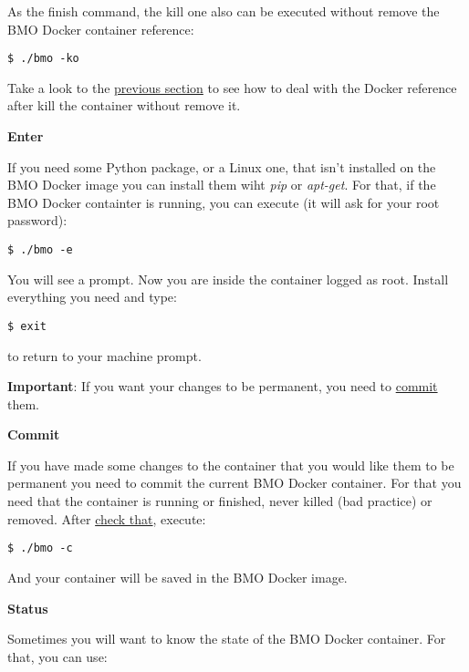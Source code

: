 As the finish command, the kill one also can be executed without remove the BMO Docker container reference:

\vspace*{3mm}
\begin{lstlisting}
$ ./bmo -ko
\end{lstlisting}

Take a look to the \hyperref[bmo:1]{previous section} to see how to deal with the Docker reference after kill the container without remove it.

\large
\textbf{Enter}

\normalsize
If you need some Python package, or a Linux one, that isn't installed on the BMO Docker image you can install them wiht \emph{pip} or \emph{apt-get}. For that, if the BMO Docker containter is running, you can execute (it will ask for your root password):

\vspace*{3mm}
\begin{lstlisting}
$ ./bmo -e
\end{lstlisting}

You will see a prompt. Now you are inside the container logged as root. Install everything you need and type:

\vspace*{3mm}
\begin{lstlisting}
$ exit
\end{lstlisting}

to return to your machine prompt.

\textbf{Important}: If you want your changes to be permanent, you need to \hyperref[bmo:2]{commit} them.

\large
\textbf{Commit} \label{bmo:2}

\normalsize
If you have made some changes to the container that you would like them to be permanent you need to commit the current BMO Docker container. For that you need that the container is running or finished, never killed (bad practice) or removed. After \hyperref[bmo:3]{check that}, execute:

\vspace*{3mm}
\begin{lstlisting}
$ ./bmo -c
\end{lstlisting}

And your container will be saved in the BMO Docker image.

\large
\textbf{Status} \label{bmo:3}

\normalsize
Sometimes you will want to know the state of the BMO Docker container. For that, you can use:

